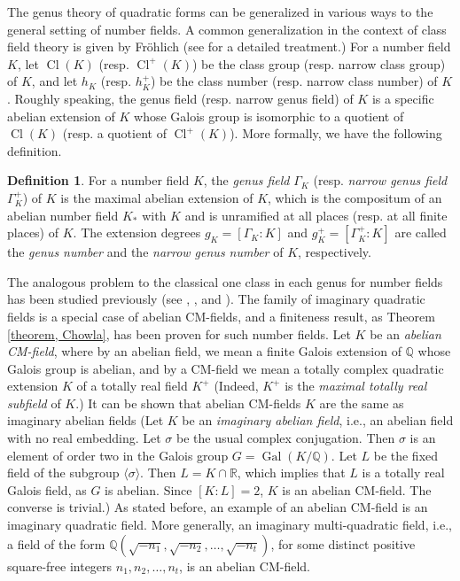 \documentclass[12pt]{amsart}
\theoremstyle{definition}
\newtheorem{definition}[theorem]{Definition}
\numberwithin{equation}{section}
\DeclareMathOperator{\Cl}{Cl}
\DeclareMathOperator{\Gal}{Gal}
\begin{document}
The genus theory of quadratic forms can be generalized in various ways to the general setting of number fields. A common generalization in the context of class field theory is given by Fr\"{o}hlich (see \cite{Ishida} for a detailed treatment.) 
  For a number field $K$, let $\Cl(K)$ (resp. $\Cl^+(K)$) be the class group (resp. narrow class group) of $K$, and let $h_K$ (resp. $h_K^+$) be the class number (resp. narrow class number) of $K$. Roughly speaking, the genus field (resp. narrow genus field) of $K$ is a specific abelian extension of $K$ whose Galois group is isomorphic to
 a quotient of $\Cl(K)$ (resp. a quotient of $\Cl^+(K)$). More formally, we have the following definition.


\begin{definition} 
\label{genus}
For a number field $K$, the \textit{genus field} $\Gamma_K$ (resp.  \textit{narrow genus field} $\Gamma_K^+$) of $K$ is the maximal abelian extension of $K$, which is the  compositum of an abelian number field $K_*$ with $K$ and is unramified at all places (resp. at all finite places) of $K$. The extension degrees $g_K=[\Gamma_K:K]$ and $g_K^+=[\Gamma_K^+:K]$ are called the \textit{genus number} and the \textit{narrow genus number} of $K$, respectively.
\end{definition}


 
The analogous problem to the classical one class in each genus for number fields has been studied previously {(see  \cite{CK}, \cite{Louboutin}, and \cite{Miyada})}. The family of imaginary quadratic fields is a special case of abelian CM-fields, and a finiteness result, as Theorem \ref{theorem, Chowla}, has been proven for such number fields.
Let $K$ be an \emph{abelian CM-field}, where by an abelian field, we mean a finite Galois extension of $\mathbb{Q}$ whose Galois group is abelian, and by a CM-field we mean a totally complex quadratic extension $K$ of a totally real field $K^+$ (Indeed, $K^+$ is the \emph{maximal totally real subfield} of $K$.)
 It can be shown that abelian CM-fields $K$ are the same as imaginary abelian fields (Let $K$ be an \emph{imaginary abelian field}, i.e., an abelian field with no real embedding. Let $\sigma$ be the usual complex conjugation. Then  $\sigma$ is an element of order two in the Galois group $G=\Gal(K/\mathbb{Q})$. Let $L$ be the fixed field of the subgroup $\langle \sigma \rangle$. Then $L=K \cap \mathbb{R}$, which implies that $L$ is a totally real Galois field, as $G$ is abelian. Since $[K:L]=2$, $K$ is an abelian CM-field. The converse is trivial.)
As stated before, an example of an abelian CM-field is an imaginary quadratic field. More generally, an imaginary multi-quadratic field, i.e., a field of the form $\mathbb{Q}(\sqrt{-n_1},\sqrt{-n_2},\dots,\sqrt{-n_t})$, for some distinct positive square-free integers $n_1,n_2,\dots,n_t$, is an abelian CM-field.
\end{document}

